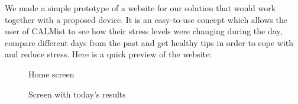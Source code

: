 \documentclass{scrartcl}
\begin{document}
We made a simple prototype of a website for our solution that would work together with a proposed device. It is an easy-to-use concept which allows the user of CALMist to see how their stress levels were changing during the day, compare different days from the past and get healthy tips in order to cope with and reduce stress. Here is a quick preview of the website:

\begin{figure}[htb]
	\begin{center}
    \end{center}
	\caption{Home screen}
	\label{fig:website-index}
\end{figure}

\begin{figure}[htb]
	\begin{center}
    \end{center}
	\caption{Screen with today's results}
	\label{fig:website-todays-results}
\end{figure}
\end{document}
